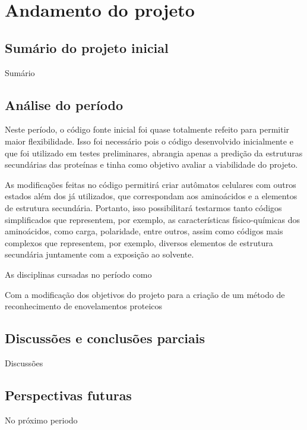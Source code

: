 \chapter{Andamento do projeto}\label{ch:introducao}
\section{Sumário do projeto inicial}
Sumário
\section{Análise do período}
Neste período, o código fonte inicial foi quase totalmente refeito para permitir maior flexibilidade. Isso foi necessário pois o código desenvolvido inicialmente e que foi utilizado em testes preliminares, abrangia apenas a predição da estruturas secundárias das proteínas e tinha como objetivo avaliar a viabilidade do projeto. 

As modificações feitas no código permitirá criar autômatos celulares com outros estados além dos já utilizados, que correspondam aos aminoácidos e a elementos de estrutura secundária. Portanto, isso possibilitará testarmos tanto códigos simplificados que representem, por exemplo, as características físico-químicas dos aminoácidos, como carga, polaridade, entre outros, assim como códigos mais complexos que representem, por exemplo, diversos elementos de estrutura secundária juntamente com a exposição ao solvente.

As disciplinas cursadas no período como  



Com a modificação dos objetivos do projeto para a criação de um método de reconhecimento de enovelamentos proteicos
\section{Discussões e conclusões parciais}
Discussões 
\section{Perspectivas futuras}
No próximo periodo
